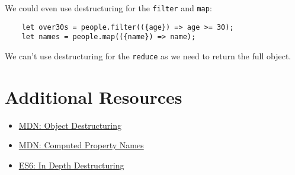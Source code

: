 We could even use destructuring for the \texttt{filter} and \texttt{map}:

\begin{verbatim}
    let over30s = people.filter(({age}) => age >= 30);
    let names = people.map(({name}) => name);
\end{verbatim}

We can't use destructuring for the \texttt{reduce} as we need to return the full object.

\section{Additional Resources}

\begin{itemize}[leftmargin=*]
    \item \href{https://developer.mozilla.org/en-US/docs/Web/JavaScript/Reference/Operators/Destructuring_assignment}{MDN: Object Destructuring}
    \item \href{https://developer.mozilla.org/en-US/docs/Web/JavaScript/Reference/Operators/Object_initializer#Computed_property_names}{MDN: Computed Property Names}
    \item \href{https://hacks.mozilla.org/2015/05/es6-in-depth-destructuring/}{ES6: In Depth Destructuring}
\end{itemize}
